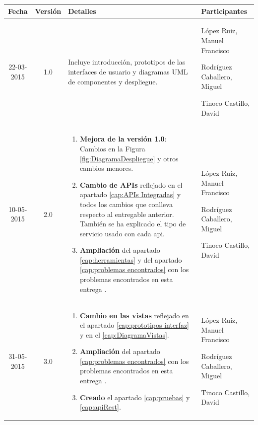 \documentclass{scrartcl}
\begin{document}
\begin{tabularx}{14.9cm}{|c|c|X|X|}
	\hline \textbf{Fecha} & \textbf{Versión} & \centering \textbf{Detalles} & \textbf{Participantes} \\ 
	\hline 22-03-2015 & 1.0 & Incluye introducción, prototipos de las interfaces de usuario y diagramas UML de componentes y despliegue.  & 
	López Ruiz, Manuel Francisco
	
	Rodríguez Caballero, Miguel
	
	Tinoco Castillo, David \\	 
		\hline 10-05-2015 & 2.0 & \begin{enumerate}[\textbf{\textperiodcentered}]
		\item \textbf{Mejora de la versión 1.0}: Cambios en la Figura \ref{fig:DiagramaDespliegue} y otros cambios menores. 
		 \item \textbf{Cambio de APIs} reflejado en el apartado \ref{cap:APIs Integradas} y todos los cambios que conlleva respecto al entregable anterior. También se ha explicado el tipo de servicio usado con cada api.
		
		\item \textbf{Ampliación} del apartado \ref{cap:herramientas} y del apartado \ref{cap:problemas encontrados} con los problemas encontrados en esta entrega  . \end{enumerate}
		 & 
		López Ruiz, Manuel Francisco
		
		Rodríguez Caballero, Miguel
		
		Tinoco Castillo, David \\
		\hline 31-05-2015 & 3.0 & \begin{enumerate}[\textbf{\textperiodcentered}]
			\item \textbf{Cambio  en las vistas} reflejado en el apartado \ref{cap:prototipos interfaz} y en el \ref{cap:DiagramaVistas}.
			
			\item \textbf{Ampliación} del apartado \ref{cap:problemas encontrados} con los problemas encontrados en esta entrega .
			
			\item \textbf{Creado} el apartado \ref{cap:pruebas} y \ref{cap:apiRest}. \end{enumerate}
		& 
		López Ruiz, Manuel Francisco
		
		Rodríguez Caballero, Miguel
		
		Tinoco Castillo, David \\	 
	\hline  
	
\end{tabularx} 
\newpage
\end{document}
